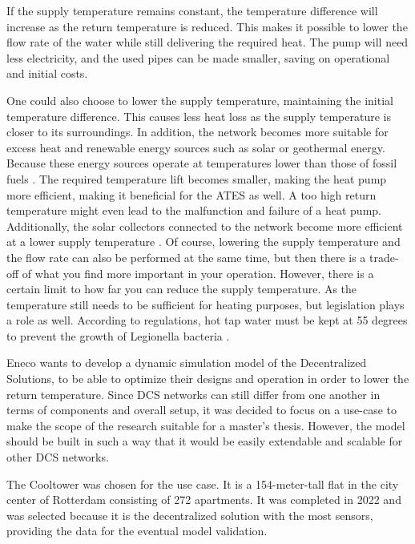 If the supply temperature remains constant, the temperature difference will increase as the return temperature is reduced. This makes it possible to lower the flow rate of the water while still delivering the required heat. The pump will need less electricity, and the used pipes can be made smaller, saving on operational and initial costs. 

One could also choose to lower the supply temperature, maintaining the initial temperature difference. This causes less heat loss as the supply temperature is closer to its surroundings. In addition, the network becomes more suitable for excess heat and renewable energy sources such as solar or geothermal energy. Because these energy sources operate at temperatures lower than those of fossil fuels \cite{sustainableResources}. The required temperature lift becomes smaller, making the heat pump more efficient, making it beneficial for the ATES as well. A too high return temperature might even lead to the malfunction and failure of a heat pump. Additionally, the solar collectors connected to the network become more efficient at a lower supply temperature \cite{booklowT}. Of course, lowering the supply temperature and the flow rate can also be performed at the same time, but then there is a trade-off of what you find more important in your operation. However, there is a certain limit to how far you can reduce the supply temperature. As the temperature still needs to be sufficient for heating purposes, but legislation plays a role as well. According to regulations, hot tap water must be kept at 55 degrees to prevent the growth of Legionella bacteria \cite{tapwaterWet}. 

Eneco wants to develop a dynamic simulation model of the Decentralized Solutions, to be able to optimize their designs and operation in order to lower the return temperature. Since DCS networks can still differ from one another in terms of components and overall setup, it was decided to focus on a use-case to make the scope of the research suitable for a master's thesis. However, the model should be built in such a way that it would be easily extendable and scalable for other DCS networks. 

The Cooltower was chosen for the use case. It is a 154-meter-tall flat in the city center of Rotterdam consisting of 272 apartments. It was completed in 2022 and was selected because it is the decentralized solution with the most sensors, providing the data for the eventual model validation.

